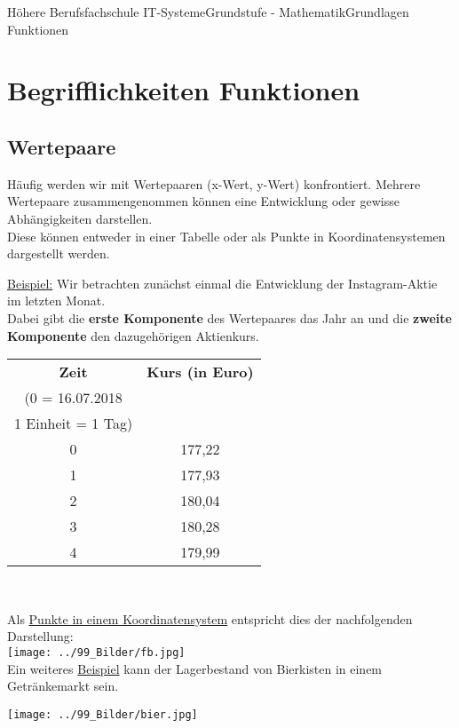 \documentclass[11pt,twocolumn,oneside,openany,headings=optiontotoc,11pt,numbers=noenddot]{article}
\begin{document}
	\begin{worksheet}{Höhere Berufsfachschule IT-Systeme}{Grundstufe - Mathematik}{Grundlagen Funktionen}
		\setcounter{section}{0}
		\section{Begrifflichkeiten Funktionen}
		\subsection{Wertepaare} Häufig werden wir mit Wertepaaren (x-Wert, y-Wert) konfrontiert. Mehrere Wertepaare zusammengenommen können eine Entwicklung oder gewisse Abhängigkeiten darstellen.\\
		Diese können entweder in einer Tabelle oder als Punkte in Koordinatensystemen dargestellt werden.\\
		\par\bigskip\noindent
		\underline{Beispiel:} Wir betrachten zunächst einmal die Entwicklung der Instagram-Aktie im letzten Monat.\\
		Dabei gibt die \textbf{erste Komponente} des Wertepaares das Jahr an und die \textbf{zweite Komponente} den dazugehörigen Aktienkurs.\\
		\par\bigskip\noindent
		\begin{tabularx}{0.45\textwidth}{c|c}
			\textbf{Zeit} & \textbf{Kurs (in Euro)}\\
			(0 = 16.07.2018 & \\
			1 Einheit = 1 Tag) & \\
			\hline
			0 & 177,22\\
			\hline
			1 & 177,93\\
			\hline
			2 & 180,04\\
			\hline
			3 & 180,28\\
			\hline
			4 & 179,99\\
			\hline
		\end{tabularx}\\
		\par\noindent
		Als \underline{Punkte in einem Koordinatensystem} entspricht dies der nachfolgenden Darstellung:\\
		\texttt{[image: ../99\_Bilder/fb.jpg]}\\
		Ein weiteres \underline{Beispiel} kann der Lagerbestand von Bierkisten in einem Getränkemarkt sein.\\
		\par\bigskip\noindent
		\texttt{[image: ../99\_Bilder/bier.jpg]}

\end{worksheet}
\end{document}
